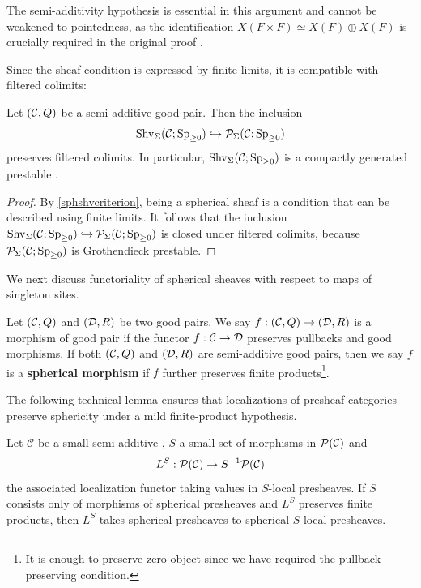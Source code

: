 \documentclass[a4paper,10pt, oneside]{amsart}
\begin{document}
	\begin{rem}
		The semi-additivity hypothesis is essential in this argument and cannot be weakened to pointedness, as the identification $X(F \times F) \simeq X(F) \oplus X(F)$ is crucially required in the original proof \cite[Theorem 2.8]{pstrkagowski2023synthetic}.
	\end{rem}
Since the sheaf condition is expressed by finite limits, it is compatible with filtered colimits:
	\begin{thm}
		Let $(\mathcal{C},Q)$ be a semi-additive good pair. Then the inclusion $$\operatorname{Shv}_\Sigma(\mathcal{C};\operatorname{Sp}_{\geq0})\hookrightarrow \mathcal{P}_\Sigma(\mathcal{C};\operatorname{Sp}_{\geq0})$$ preserves filtered colimits. In particular, $\operatorname{Shv}_\Sigma(\mathcal{C};\operatorname{Sp}_{\geq0})$ is a compactly generated prestable \infcat.
	\end{thm}
	\begin{proof}
		By \cref{sphshvcriterion}, being a spherical sheaf is a condition that can be
		described using finite limits. It follows that the inclusion $\operatorname{Shv}_\Sigma(\mathcal{C};\operatorname{Sp}_{\geq0})\hookrightarrow \mathcal{P}_\Sigma(\mathcal{C};\operatorname{Sp}_{\geq0})$ is closed under filtered colimits, because $\mathcal{P}_\Sigma(\mathcal{C};\operatorname{Sp}_{\geq0})$ is Grothendieck prestable.
	\end{proof}
	We next discuss functoriality of spherical sheaves with respect to maps of singleton sites.
		\begin{de}
		Let $(\mathcal{C},Q)$ and $(\mathcal{D},R)$ be two good pairs. %
		We say $f:(\mathcal{C},Q)\to (\mathcal{D},R)$ is a morphism of good pair if the functor $f:\mathcal{C} \to \mathcal{D}$ preserves pullbacks and good morphisms. If both $(\mathcal{C},Q)$ and $(\mathcal{D},R)$ are semi-additive good pairs, then we say $f$ is a \textbf{spherical morphism} if $f$ further preserves finite products\footnote{It is enough to preserve zero object since we have required the pullback-preserving condition.}.
	\end{de}
	The following technical lemma ensures that localizations of presheaf categories preserve sphericity under a mild finite-product hypothesis.
		\begin{lem}\label{LSpreservesphe-semi}
		Let $\mathcal{C}$ be a small semi-additive  \infcat, $S$ a small set of morphisms in $\mathcal{P}(\mathcal{C})$ and $$L^S: \mathcal{P}(\mathcal{C}) \rightarrow S^{-1} \mathcal{P}(\mathcal{C})$$ the associated localization functor taking values in $S$-local presheaves. If $S$ consists only of morphisms of spherical presheaves and $L^S$ preserves finite products, then $L^S$ takes spherical presheaves to spherical $S$-local presheaves.
	\end{lem}
\end{document}
